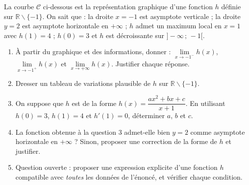 \documentclass[11pt]{article}
\def\setminus{\mathbin{\backslash}}\let\smallsetminus\setminus
\begin{document}
\begin{exercice}
La courbe $\mathscr{C}$ ci-dessous est la représentation graphique d'une fonction $h$ définie sur $\mathbb{R}\setminus\{-1\}$. On sait que : la droite $x=-1$ est asymptote verticale ; la droite $y=2$ est asymptote horizontale en $+\infty$ ; $h$ admet un maximum local en $x=1$ avec $h(1)=4$ ; $h(0)=3$ et $h$ est décroissante sur $]-\infty\,;\,-1[$.

\begin{center}
\end{center}

\begin{enumerate}
\item À partir du graphique et des informations, donner : $\lim\limits_{x\to -1^-}h(x)$, $\lim\limits_{x\to -1^+}h(x)$ et $\lim\limits_{x\to +\infty}h(x)$. Justifier chaque réponse.
\item Dresser un tableau de variations plausible de $h$ sur $\mathbb{R}\setminus\{-1\}$.
\item On suppose que $h$ est de la forme $h(x)=\dfrac{ax^2+bx+c}{x+1}$. En utilisant $h(0)=3$, $h(1)=4$ et $h'(1)=0$, déterminer $a$, $b$ et $c$.
\item La fonction obtenue à la question 3 admet-elle bien $y=2$ comme asymptote horizontale en $+\infty$ ? Sinon, proposer une correction de la forme de $h$ et justifier.
\item Question ouverte : proposer une expression explicite d'une fonction $h$ compatible avec \emph{toutes} les données de l'énoncé, et vérifier chaque condition.
\end{enumerate}
\end{exercice}
\end{document}

